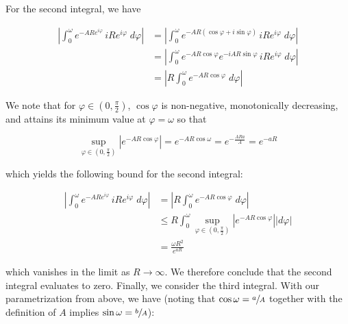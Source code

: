 \begin{solution}
    \pagebreak
    For the second integral, we have

    \begin{align*}
        \left| \int_0^{\omega} e^{-AR e^{i \varphi}} \, i R e^{i \varphi} \; d\varphi \right| 
        &= \left| \int_0^{\omega} e^{-AR (\cos \varphi + i \sin{\varphi})} \, i R e^{i \varphi} \; d\varphi \right| \\
        &= \left| \int_0^{\omega} e^{-AR \cos \varphi} e^{-i A R \sin{\varphi}} \, i R e^{i \varphi} \; d\varphi \right| \\
        &= \left| R \int_0^{\omega} e^{-AR \cos \varphi} \; d\varphi \right| 
    \end{align*}

    We note that for $\varphi \in \left(0, \frac{\pi}{2} \right)$, $\cos{\varphi}$ is non-negative, monotonically 
    decreasing, and attains its minimum value at $\varphi = \omega$ so that 
    
    $$
        \sup_{\varphi \in \left(0, \frac{\pi}{2} \right)} \left| e^{-A R \cos{\varphi}} \right| 
          = e^{-A R \cos{\omega}} 
          = e^{-\frac{A R a}{A}} 
          = e^{-a R}
    $$

    which yields the following bound for the second integral:

    \begin{align*}
        \left| \int_0^{\omega} e^{-AR e^{i \varphi}} \, i R e^{i \varphi} \; d\varphi \right| 
        &=   \left| R \int_0^{\omega} e^{-AR \cos \varphi} \; d\varphi \right|  \\
        &\le R \int_0^{\omega} \sup_{\varphi \in \left(0, \frac{\pi}{2} \right)} \left| e^{-A R \cos{\varphi}} \right| |d\varphi| \\
        &=  \frac{\omega R^2}{e^{aR}}
    \end{align*}

    which vanishes in the limit as $R \to \infty$. We therefore conclude that the second integral evaluates to zero.
    Finally, we consider the third integral. With our parametrization from above, we have (noting that 
    $\cos{\omega} = \sfrac{a}{A}$ together with the definition of $A$ implies $\sin{\omega} = \sfrac{b}{A}$):


\end{solution}
